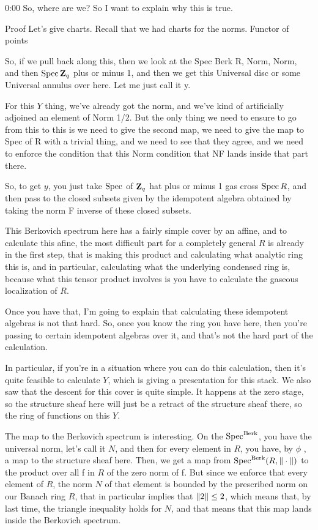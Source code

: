 \begin{unfinished}{0:00}
So, where are we?
So I want to explain why this is true. 

Proof
Let's give charts.
Recall that we had charts for the norms.
Functor of points

So, if we pull back along this, then we look at the Spec Berk R, Norm, Norm, and then $\operatorname{Spec} \mathbf Z_q$ plus or minus 1, and then we get this Universal disc or some Universal annulus over here. Let me just call it y.

For this $Y$ thing, we've already got the norm, and we've kind of artificially adjoined an element of Norm 1/2. But the only thing we need to ensure to go from this to this is we need to give the second map, we need to give the map to Spec of R with a trivial thing, and we need to see that they agree, and we need to enforce the condition that this Norm condition that NF lands inside that part there.

So, to get $y$, you just take $\operatorname{Spec}$ of $\mathbf Z_q$ hat plus or minus 1 gas cross $\operatorname{Spec} R$, and then pass to the closed subsets given by the idempotent algebra obtained by taking the norm F inverse of these closed subsets.

This Berkovich spectrum here has a fairly simple cover by an affine, and to calculate this afine, the most difficult part for a completely general $R$ is already in the first step, that is making this product and calculating what analytic ring this is, and in particular, calculating what the underlying condensed ring is, because what this tensor product involves is you have to calculate the gaseous localization of $R$.

Once you have that, I'm going to explain that calculating these idempotent algebras is not that hard. So, once you know the ring you have here, then you're passing to certain idempotent algebras over it, and that's not the hard part of the calculation.

In particular, if you're in a situation where you can do this calculation, then it's quite feasible to calculate $Y$, which is giving a presentation for this stack. We also saw that the descent for this cover is quite simple. It happens at the zero stage, so the structure sheaf here will just be a retract of the structure sheaf there, so the ring of functions on this $Y$.


The map to the Berkovich spectrum is interesting. On the $\operatorname{Spec}^{\mathrm{Berk}}$, you have the universal norm, let's call it $N$, and then for every element in $R$, you have, by $\phi$ , a map to the structure sheaf here. Then, we get a map from $\operatorname{Spec}^{\mathrm{Berk}} (R, \| \cdot \| )$ to the product over all f in $R$ of the zero norm of f.
But since we enforce that every element of $R$, the norm $N$ of that element is bounded by the prescribed norm on our Banach ring $R$, that in particular implies that $\| 2 \| \leq 2$, which means that, by last time, the triangle inequality holds for $N$, and that means that this map lands inside the Berkovich spectrum.


\end{unfinished}
